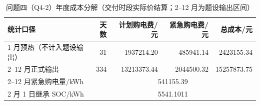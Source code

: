 \begin{table}[htbp]
\centering
\caption{问题四（Q4-2）年度成本分解（交付时段实际价结算；2--12 月为题设输出区间）}\label{tab:q4-cost-summary}
\normalsize\setlength{\tabcolsep}{6pt}
\begin{tabular}{@{}lrrrr@{}}
\toprule
统计口径 & 天数 & 计划购电费/元 & 紧急购电费/元 & 总成本/元 \\
\midrule
1 月预热（不计入题设输出） & 31 & 1937214.20 & 485941.14 & 2423155.34 \\
2--12 月正式输出 & 334 & 13213373.44 & 2044500.32 & 15257873.75 \\
\midrule
2--12 月紧急购电量/kWh & \multicolumn{4}{c}{541155.39} \\
2 月 1 日继承 SOC/kWh & \multicolumn{4}{c}{5541.1011} \\
\bottomrule
\end{tabular}
\end{table}
